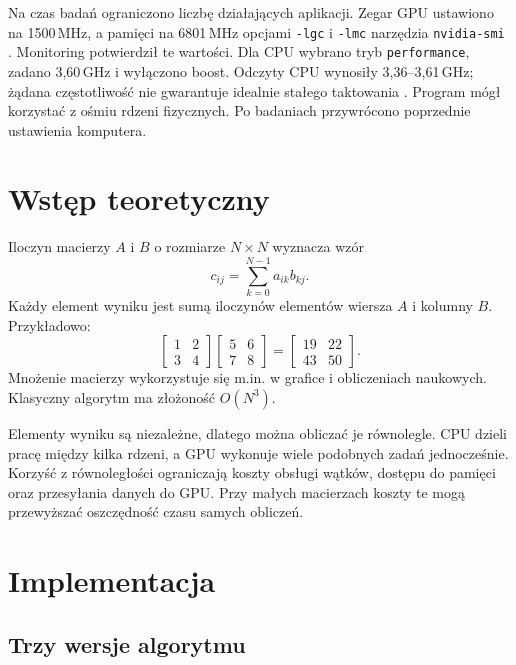 \documentclass[12pt,a4paper]{article}
\begin{document}
Na czas badań ograniczono liczbę działających aplikacji.
Zegar GPU ustawiono na 1500\,MHz, a pamięci na 6801\,MHz
opcjami \texttt{-lgc} i \texttt{-lmc} narzędzia
\texttt{nvidia-smi} \cite{nvsmi}. Monitoring potwierdził te wartości.
Dla CPU wybrano tryb \texttt{performance}, zadano 3,60\,GHz
i wyłączono boost. Odczyty CPU wynosiły 3,36--3,61\,GHz;
żądana częstotliwość nie gwarantuje idealnie stałego taktowania
\cite{cpufreq}. Program mógł korzystać z ośmiu rdzeni fizycznych.
Po badaniach przywrócono poprzednie ustawienia komputera.

\section{Wstęp teoretyczny}

Iloczyn macierzy $A$ i $B$ o rozmiarze $N\times N$ wyznacza wzór
\begin{equation}
c_{ij}=\sum_{k=0}^{N-1} a_{ik}b_{kj}.
\end{equation}
Każdy element wyniku jest sumą iloczynów elementów wiersza $A$
i kolumny $B$. Przykładowo:
\[
\begin{bmatrix}1&2\\3&4\end{bmatrix}
\begin{bmatrix}5&6\\7&8\end{bmatrix}
=\begin{bmatrix}19&22\\43&50\end{bmatrix}.
\]
Mnożenie macierzy wykorzystuje się m.in. w grafice i obliczeniach
naukowych. Klasyczny algorytm ma złożoność $O(N^3)$.

Elementy wyniku są niezależne, dlatego można obliczać je równolegle.
CPU dzieli pracę między kilka rdzeni, a GPU wykonuje wiele podobnych
zadań jednocześnie. Korzyść z równoległości ograniczają koszty
obsługi wątków, dostępu do pamięci oraz przesyłania danych do GPU.
Przy małych macierzach koszty te mogą przewyższać oszczędność czasu
samych obliczeń.

\section{Implementacja}

\subsection{Trzy wersje algorytmu}
\end{document}
